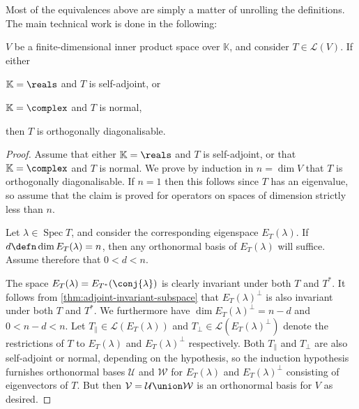 \documentclass[a4paper, 11pt]{memoir}
\numberwithin{equation}{chapter}
\newcommand{\calL}{\mathcal{L}}
\newcommand{\calV}{\mathcal{V}}
\newcommand{\calW}{\mathcal{W}}
\newcommand{\calU}{\mathcal{U}}
\DeclareMathOperator{\spec}{Spec}
\begin{document}
Most of the equivalences above are simply a matter of unrolling the definitions. The main technical work is done in the following:

\begin{lemma}
    \label{lem:spectral-lemma}
    $V$ be a finite-dimensional inner product space over $\mathbb{K}$, and consider $T \in \calL(V)$. If either
    \begin{enumthm}
        \item $\mathbb{K} = \reals$ and $T$ is self-adjoint, or
        \item $\mathbb{K} = \complex$ and $T$ is normal,
    \end{enumthm}
    then $T$ is orthogonally diagonalisable.
\end{lemma}

\begin{proof}
    Assume that either $\mathbb{K} = \reals$ and $T$ is self-adjoint, or that $\mathbb{K} = \complex$ and $T$ is normal. We prove by induction in $n = \dim V$ that $T$ is orthogonally diagonalisable. If $n = 1$ then this follows since $T$ has an eigenvalue, so assume that the claim is proved for operators on spaces of dimension strictly less than $n$.

    Let $\lambda \in \spec T$, and consider the corresponding eigenspace $E_T(\lambda)$. If $d \defn \dim E_T(\lambda) = n$, then any orthonormal basis of $E_T(\lambda)$ will suffice. Assume therefore that $0 < d < n$.

    The space $E_T(\lambda) = E_{T^*}(\conj{\lambda})$ is clearly invariant under both $T$ and $T^*$. It follows from \cref{thm:adjoint-invariant-subspace} that $E_T(\lambda)^\perp$ is also invariant under both $T$ and $T^*$. We furthermore have $\dim E_T(\lambda)^\perp = n-d$ and $0 < n-d < n$. Let $T_\parallel \in \calL(E_T(\lambda))$ and $T_\perp \in \calL(E_T(\lambda)^\perp)$ denote the restrictions of $T$ to $E_T(\lambda)$ and $E_T(\lambda)^\perp$ respectively. Both $T_\parallel$ and $T_\perp$ are also self-adjoint or normal, depending on the hypothesis, so the induction hypothesis furnishes orthonormal bases $\calU$ and $\calW$ for $E_T(\lambda)$ and $E_T(\lambda)^\perp$ consisting of eigenvectors of $T$. But then $\calV = \calU \union \calW$ is an orthonormal basis for $V$ as desired.
\end{proof}
\end{document}
